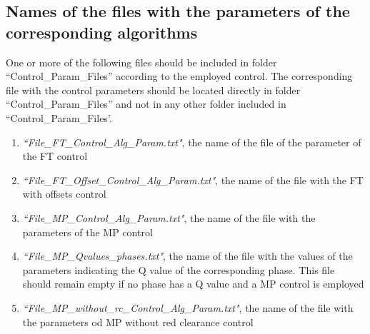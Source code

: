 \subsection{Names of the files  with  the  parameters of the corresponding algorithms }

One or more of the following files should be included  in folder ``Control\_Param\_Files'' according to the employed control. The corresponding file with the control parameters should  be located directly in folder ``Control\_Param\_Files'' and not in any other folder included in ``Control\_Param\_Files'.
\begin{enumerate}
\item \emph{``File\_FT\_Control\_Alg\_Param.txt"}, the name of the file of the parameter of the FT control
\item \emph{``File\_FT\_Offset\_Control\_Alg\_Param.txt"}, the name of the file with the FT with offsets control
\item \emph{``File\_MP\_Control\_Alg\_Param.txt"}, the name of the file with the parameters of the MP control
\item \emph{``File\_MP\_Qvalues\_phases.txt"}, the name of the file with the values of the parameters indicating the Q value of the corresponding phase. This file should remain empty if no phase has a Q value and a MP control is employed
\item \emph{``File\_MP\_without\_rc\_Control\_Alg\_Param.txt"}, the name of the file with the parameters od MP without red clearance control


\end{enumerate}
